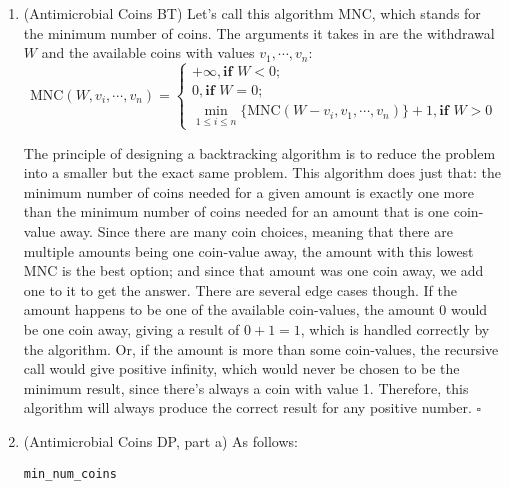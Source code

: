 \documentclass{article}
\begin{document}
\begin{enumerate}

  \item (Antimicrobial Coins BT) Let's call this algorithm MNC, which stands for the minimum number of coins. The arguments it takes in are the withdrawal $W$ and the available coins with values $v_1, \cdots, v_n$:
    $$
      \text{MNC}(W, v_i, \cdots, v_n) = \begin{cases}
        +\infty, \textbf{if }W < 0; \\
        0, \textbf{if }W = 0;       \\
        \min_{1 \le i \le n}\{\text{MNC}(W-v_i, v_1, \cdots, v_n)\} + 1, \textbf{if }W > 0
      \end{cases}
    $$

    The principle of designing a backtracking algorithm is to reduce the problem into a smaller but the exact same problem. This algorithm does just that: the minimum number of coins needed for a given amount is exactly one more than the minimum number of coins needed for an amount that is one coin-value away. Since there are many coin choices, meaning that there are multiple amounts being one coin-value away, the amount with this lowest MNC is the best option; and since that amount was one coin away, we add one to it to get the answer. There are several edge cases though. If the amount happens to be one of the available coin-values, the amount 0 would be one coin away, giving a result of $0+1=1$, which is handled correctly by the algorithm. Or, if the amount is more than some coin-values, the recursive call would give positive infinity, which would never be chosen to be the minimum result, since there's always a coin with value 1. Therefore, this algorithm will always produce the correct result for any positive number. $\square$

    \pagebreak

  \item (Antimicrobial Coins DP, part a) As follows:

    \begin{center}
      \begin{minipage}{0.625\linewidth}
        \renewcommand{\thealgocf}{}
        \begin{algorithm}[H]
          \caption{\tt min\_num\_coins}

          \texttt{\\}


\end{algorithm}
\end{minipage}
\end{center}
\end{enumerate}
\end{document}
